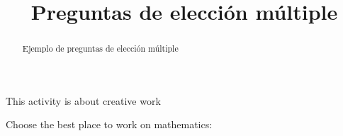 \documentclass{ximera}
\title{Preguntas de elección m\'ultiple}
\begin{document}
  
\begin{abstract}  
	Ejemplo de preguntas de elección m\'ultiple
\end{abstract}  
\maketitle  

This activity is about creative work
\begin{exercise}  
  Choose the best place to work on mathematics:
  \begin{multipleChoice}  
  \end{multipleChoice}  
\end{exercise}  
\end{document}

